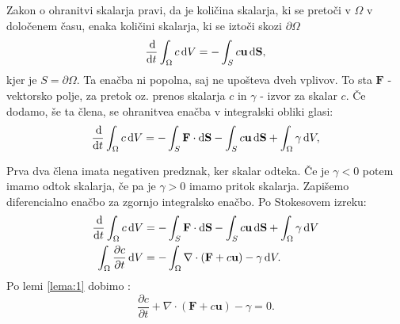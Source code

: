 \documentclass[mat2, tisk]{fmfdelo}
\newcommand{\bd}{\textbf}
\begin{document}
Zakon o ohranitvi skalarja pravi, da je količina skalarja, ki se pretoči v $\Omega$ v določenem času, 
enaka količini skalarja, ki se iztoči skozi $\partial\Omega$
\begin{equation}
\frac{\dif}{\dif t} \int_{\Omega} c \dif V =  - \int_S c \bd{u} \dif \bd{S},
\end{equation}
kjer je $S = \partial \Omega$. Ta enačba ni popolna, saj ne upošteva dveh vplivov.
To sta $\bd{F}$ - vektorsko polje, za pretok oz. prenos skalarja $c$ in $\gamma$ - izvor za skalar $c$.
Če dodamo, še ta člena, se ohranitvea enačba v integralski obliki glasi:
\begin{equation}
  \frac{\dif}{\dif t} \int_{\Omega} c \dif V = - \int_S \bd{F} \cdot \dif \bd{S} - 
  \int_S c \bd{u}  \dif \bd{S} + \int_\Omega \gamma \dif V,
\end{equation}    

Prva dva člena imata negativen predznak, ker skalar odteka. Če je $\gamma < 0$ potem imamo odtok skalarja, če pa je $\gamma > 0$ imamo pritok skalarja. 
Zapišemo diferencialno enačbo za zgornjo integralsko enačbo. Po Stokesovem izreku:
\begin{align*}
\frac{\dif}{\dif t} \int_{\Omega} c \dif V &= - \int_S \bd{F} \cdot \dif \bd{S} - 
\int_S c \bd{u}  \dif \bd{S} + \int_\Omega \gamma \dif V \\
\int_{\Omega} \frac{\partial c}{\partial t} \dif V &= - \int_\Omega \nabla\cdot(\bd{F} + c \bd{u}) - \gamma \dif V .
\end{align*}
Po lemi \ref{lema:1} dobimo :
\begin{equation}
\frac{\partial c}{\partial t} + \nabla \cdot (\bd{F} + c\bd{u}) - \gamma = 0.
\end{equation}
\end{document}
